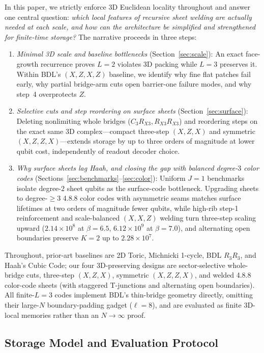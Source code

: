 \documentclass[aps,prx,reprint,superscriptaddress,nofootinbib,floatfix]{revtex4-2}
\begin{document}
In this paper, we strictly enforce 3D Euclidean locality throughout and answer one central question: \emph{which local features of recursive sheet welding are actually needed at each scale, and how can the architecture be simplified and strengthened for finite-time storage?} The narrative proceeds in three steps:
\begin{enumerate}
  \item \emph{Minimal 3D scale and baseline bottlenecks} (Section~\ref{sec:scale}): An exact face-growth recurrence proves $L = 2$ violates 3D packing while $L = 3$ preserves it. Within BDL's $(X, Z, X, Z)$ baseline, we identify why fine flat patches fail early, why partial bridge-arm cuts open barrier-one failure modes, and why step~4 overprotects $Z$.
  \item \emph{Selective cuts and step reordering on surface sheets} (Section~\ref{sec:surface}): Deleting nonlimiting whole bridges ($C_3 R_{X3}, R_{X3} R_{X3}$) and reordering steps on the exact same 3D complex---compact three-step $(X, Z, X)$ and symmetric $(X, Z, Z, X)$---extends storage by up to three orders of magnitude at lower qubit cost, independently of readout decoder choice.
  \item \emph{Why surface sheets lag Haah, and closing the gap with balanced degree-$3$ color codes} (Sections~\ref{sec:benchmarks}--\ref{sec:color}): Uniform $J = 1$ benchmarks isolate degree-$2$ sheet qubits as the surface-code bottleneck. Upgrading sheets to degree-$\ge 3$ 4.8.8 color codes with asymmetric seams matches surface lifetimes at two orders of magnitude fewer qubits, while high-rib step-1 reinforcement and scale-balanced $(X, X, Z)$ welding turn three-step scaling upward ($2.14 \times 10^8$ at $\beta = 6.5$, $6.12 \times 10^9$ at $\beta = 7.0$), and alternating open boundaries preserve $K = 2$ up to $2.28 \times 10^7$.
\end{enumerate}
Throughout, prior-art baselines are 2D Toric, Michnicki 1-cycle, BDL $R_3 R_3$, and Haah's Cubic Code; our four 3D-preserving designs are sector-selective whole-bridge cuts, three-step $(X, Z, X)$, symmetric $(X, Z, Z, X)$, and welded 4.8.8 color-code sheets (with staggered T-junctions and alternating open boundaries). All finite-$L = 3$ codes implement BDL's thin-bridge geometry directly, omitting their large-$N$ boundary-padding gadget ($\ell = 8$), and are evaluated as finite 3D-local memories rather than an $N \to \infty$ proof.

\subsection{Storage Model and Evaluation Protocol}
\end{document}
